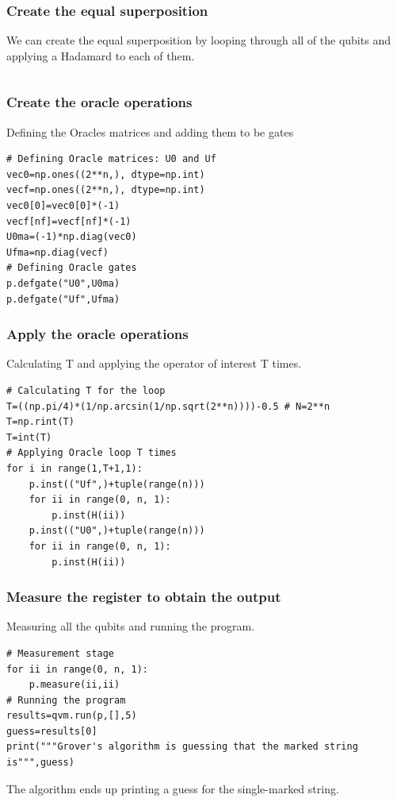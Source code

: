 \subsubsection{Create the equal superposition}

We can create the equal superposition by looping through all of the qubits and applying a Hadamard to each of them.

\inputminted[firstnumber=22, firstline=22, lastline=24]{python}{code/pyQuil/grover_pyquil_guide.txt}

\subsubsection{Create the oracle operations}

Defining the Oracles matrices and adding them to be gates
\begin{verbatim}
# Defining Oracle matrices: U0 and Uf
vec0=np.ones((2**n,), dtype=np.int)
vecf=np.ones((2**n,), dtype=np.int)
vec0[0]=vec0[0]*(-1)
vecf[nf]=vecf[nf]*(-1)
U0ma=(-1)*np.diag(vec0) 
Ufma=np.diag(vecf) 
# Defining Oracle gates
p.defgate("U0",U0ma)
p.defgate("Uf",Ufma)
\end{verbatim}

\subsubsection{Apply the oracle operations}

Calculating T and applying the operator of interest T times.
\begin{verbatim}
# Calculating T for the loop
T=((np.pi/4)*(1/np.arcsin(1/np.sqrt(2**n))))-0.5 # N=2**n
T=np.rint(T)
T=int(T)
# Applying Oracle loop T times
for i in range(1,T+1,1):
    p.inst(("Uf",)+tuple(range(n)))
    for ii in range(0, n, 1):
        p.inst(H(ii))
    p.inst(("U0",)+tuple(range(n)))
    for ii in range(0, n, 1):
        p.inst(H(ii))
\end{verbatim}

\subsubsection{Measure the register to obtain the output}

Measuring all the qubits and running the program.
\begin{verbatim}
# Measurement stage
for ii in range(0, n, 1):
    p.measure(ii,ii)
# Running the program
results=qvm.run(p,[],5)
guess=results[0]
print("""Grover's algorithm is guessing that the marked string is""",guess)
\end{verbatim}
The algorithm ends up printing a guess for the single-marked string.

